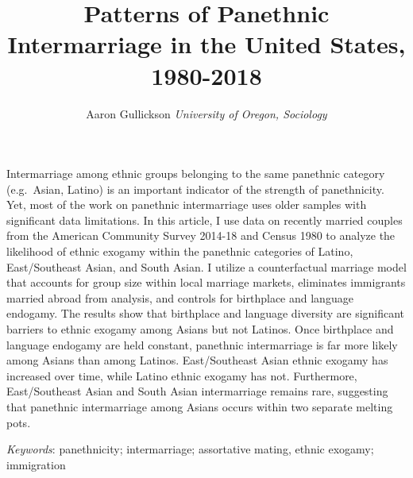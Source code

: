 \documentclass[11pt,]{article}
\title{Patterns of Panethnic Intermarriage in the United States, 1980-2018  }
\author{\Large Aaron Gullickson\vspace{0.05in} \newline\normalsize\emph{University of Oregon, Sociology}  }
\date{}
\renewenvironment{abstract}
 {{%
    \setlength{\leftmargin}{0mm}
    \setlength{\rightmargin}{\leftmargin}%
  }%
  \relax}
 {\endlist}
\begin{document}
%




{%
\setlength{\parindent}{0pt}
\thispagestyle{plain}
{\fontsize{18}{20}\selectfont\raggedright
\maketitle  %

}

{
   \vskip 13.5pt\relax \normalsize\fontsize{11}{12}
\hfill 

}

}







\begin{abstract}

    \hbox{\vrule height .2pt width 39.14pc}

    \vskip 8.5pt %

\noindent Intermarriage among ethnic groups belonging to the same panethnic category (e.g.~Asian, Latino) is an important indicator of the strength of panethnicity. Yet, most of the work on panethnic intermarriage uses older samples with significant data limitations. In this article, I use data on recently married couples from the American Community Survey 2014-18 and Census 1980 to analyze the likelihood of ethnic exogamy within the panethnic categories of Latino, East/Southeast Asian, and South Asian. I utilize a counterfactual marriage model that accounts for group size within local marriage markets, eliminates immigrants married abroad from analysis, and controls for birthplace and language endogamy. The results show that birthplace and language diversity are significant barriers to ethnic exogamy among Asians but not Latinos. Once birthplace and language endogamy are held constant, panethnic intermarriage is far more likely among Asians than among Latinos. East/Southeast Asian ethnic exogamy has increased over time, while Latino ethnic exogamy has not. Furthermore, East/Southeast Asian and South Asian intermarriage remains rare, suggesting that panethnic intermarriage among Asians occurs within two separate melting pots.


\vskip 8.5pt \noindent \emph{Keywords}: panethnicity; intermarriage; assortative mating, ethnic exogamy; immigration \par

    \hbox{\vrule height .2pt width 39.14pc}



\end{abstract}
\end{document}
